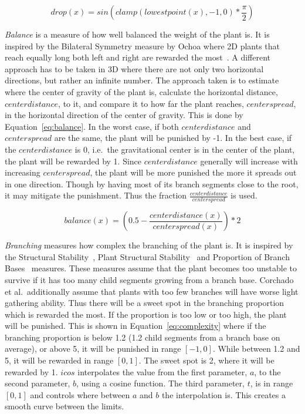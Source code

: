 \begin{equation}
\label{eq:drop}
drop(x) = sin(clamp(lowestpoint(x), -1, 0) * \frac{\pi}{2})
\end{equation}

\textit{Balance} is a measure of how well balanced the weight of the plant is.
It is inspired by the Bilateral Symmetry measure by Ochoa where 2D plants that reach equally long both left and right are rewarded the most~\cite{1998Ochoa}.
A different approach has to be taken in 3D where there are not only two horizontal directions, but rather an infinite number.
The approach taken is to estimate where the center of gravity of the plant is, calculate the horizontal distance, $centerdistance$, to it, and compare it to how far the plant reaches, $centerspread$, in the horizontal direction of the center of gravity.
This is done by Equation~\ref{eq:balance}.
In the worst case, if both $centerdistance$ and $centerspread$ are the same, the plant will be punished by -1.
In the best case, if the $centerdistance$ is 0, i.e.\ the gravitational center is in the center of the plant, the plant will be rewarded by 1.
Since $centerdistance$ generally will increase with increasing $centerspread$, the plant will be more punished the more it spreads out in one direction.
Though by having most of its branch segments close to the root, it may mitigate the punishment.
Thus the fraction $\frac{centerdistance}{centerspread}$ is used.

\begin{equation}
\label{eq:balance}
balance(x) = (0.5 - \frac{centerdistance(x)}{centerspread(x)}) * 2
\end{equation}

\textit{Branching} measures how complex the branching of the plant is.
It is inspired by the Structural Stability~\cite{1998Ochoa}, Plant Structural Stability~\cite{2009Corchado} and Proportion of Branch Bases~\cite{1998Ochoa} measures.
These measures assume that the plant becomes too unstable to survive if it has too many child segments growing from a branch base.
Corchado et al.\ additionally assume that plants with too few branches will have worse light gathering ability.
Thus there will be a sweet spot in the branching proportion which is rewarded the most.
If the proportion is too low or too high, the plant will be punished.
This is shown in Equation~\ref{eq:complexity} where if the branching proportion is below 1.2 (1.2 child segments from a branch base on average), or above 5, it will be punished in range $[-1, 0]$.
While between 1.2 and 5, it will be rewarded in range $[0, 1]$.
The sweet spot is 2, where it will be rewarded by 1.
$icos$ interpolates the value from the first parameter, $a$, to the second parameter, $b$, using a cosine function.
The third parameter, $t$, is in range $[0, 1]$ and controls where between $a$ and $b$ the interpolation is.
This creates a smooth curve between the limits.

